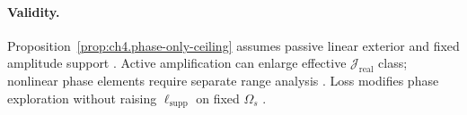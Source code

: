 \paragraph{Validity.}
Proposition~\ref{prop:ch4.phase-only-ceiling} assumes passive linear exterior and fixed amplitude support \cite{stratton1941}. Active amplification can enlarge
effective \(\mathcal{J}_{\mathrm{real}}\) class; nonlinear phase elements require separate range analysis \cite{harrington2001,devaney2004}. Loss modifies
phase exploration without raising \(\ell_{\mathrm{supp}}\) on fixed \(\Omega_{s}\) \cite{hansen1988,jackson1999,collin2001}.
